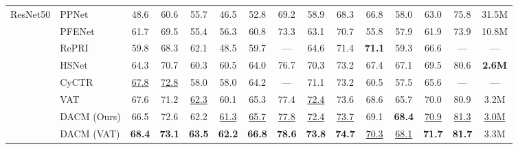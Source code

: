 \documentclass[runningheads]{llncs}
\begin{document}
\begin{table}[tbp]
{\begin{tabular}{clccccccccccccc}
\multirow{8}{*}{ResNet50 \cite{he2016deep}}& PPNet \cite{liu2020part}& 48.6 & 60.6 & 55.7 & 46.5 & 52.8 & 69.2 & 58.9 & 68.3 & 66.8 & 58.0 & 63.0 & 75.8 & 31.5M \\
 & PFENet \cite{tian2020prior}& 61.7 & 69.5 & 55.4 & 56.3 & 60.8 & 73.3 & 63.1 & 70.7 & 55.8 & 57.9 & 61.9 & 73.9 & 10.8M \\
 & RePRI \cite{boudiaf2021few}& 59.8 & 68.3 & 62.1 & 48.5 & 59.7 & --- & 64.6 & 71.4 & \textbf{71.1} & 59.3 & 66.6 & --- & --- \\ 
 &HSNet \cite{min2021hypercorrelation}& 64.3 & 70.7 & 60.3 & 60.5 & 64.0 & 76.7 & 70.3 & 73.2 & 67.4 & 67.1 & 69.5 & 80.6 & \textbf{2.6M}\\
 &CyCTR \cite{zhang2021few}& \underline{67.8} & \underline{72.8} & 58.0 & 58.0 & 64.2 & --- & 71.1 & 73.2 & 60.5 & 57.5 & 65.6 & --- & ---\\ 
 & VAT \cite{hong2021cost} & 67.6 &71.2 &\underline{62.3} &60.1 &65.3 &77.4 &\underline{72.4} &73.6 &68.6 &65.7 &70.0 &80.9 & 3.2M\\ \cline{2-15} 
 & DACM (Ours) &66.5 & 72.6 & 62.2 & \underline{61.3} & \underline{65.7}& \underline{77.8} & \underline{72.4} & \underline{73.7} & 69.1 & \textbf{68.4} & \underline{70.9} & \underline{81.3} & \underline{3.0M} \\
 & DACM (VAT) &\textbf{68.4} & \textbf{73.1} & \textbf{63.5} & \textbf{62.2} & \textbf{66.8} & \textbf{78.6} & \textbf{73.8} & \textbf{74.7} & \underline{70.3} & \underline{68.1} & \textbf{71.7} & \textbf{81.7} & 3.3M \\ \hline
 

\end{tabular}}
\end{table}
\end{document}
